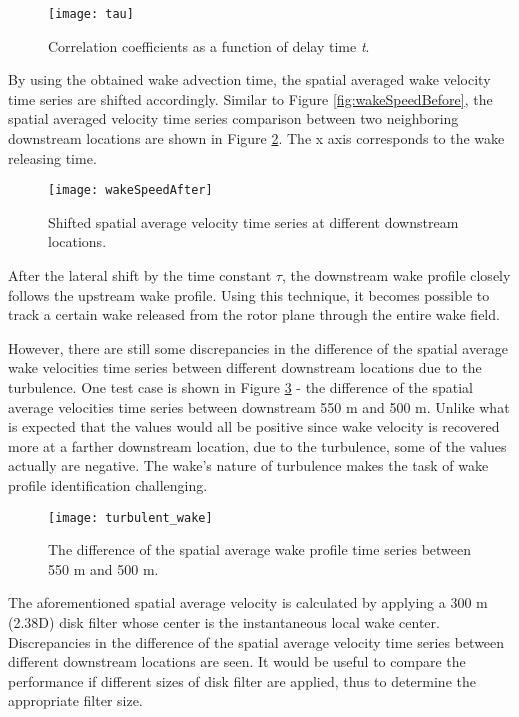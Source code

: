 \documentclass{umthesis}
\begin{document}
\begin{figure}
  \centering
  \texttt{[image: tau]}
  \caption{Correlation coefficients as a function of delay time \textit{t}.}\label{fig:tau}
\end{figure}

By using the obtained wake advection time, the spatial averaged wake velocity time series are shifted accordingly. Similar to Figure \ref{fig:wakeSpeedBefore}, the spatial averaged velocity time series comparison between two neighboring downstream locations are shown in Figure \ref{fig:wakeSpeedAfter}. The x axis corresponds to the wake releasing time.

\begin{figure}
  \centering
  \texttt{[image: wakeSpeedAfter]}
  \caption{Shifted spatial average velocity time series at different downstream locations.}\label{fig:wakeSpeedAfter}
\end{figure}

After the lateral shift by the time constant $\tau$, the downstream wake profile closely follows the upstream wake profile. Using this technique, it becomes possible to track a certain wake released from the rotor plane through the entire wake field. 

However, there are still some discrepancies in the difference of the spatial average wake velocities time series between different downstream locations due to the turbulence. One test case is shown in Figure \ref{fig:turbulent_wake} - the difference of the spatial average velocities time series between downstream 550 m and 500 m. Unlike what is expected that the values would all be positive since wake velocity is recovered more at a farther downstream location, due to the turbulence, some of the values actually are negative. The wake's nature of turbulence makes the task of wake profile identification challenging.

\begin{figure}
  \centering
  \texttt{[image: turbulent\_wake]}
  \caption{The difference of the spatial average wake profile time series between 550 m and 500 m.}\label{fig:turbulent_wake}
\end{figure}

The aforementioned spatial average velocity is calculated by applying a 300 m (2.38D) disk filter whose center is the instantaneous local wake center. Discrepancies in the difference of the spatial average velocity time series between different downstream locations are seen. It would be useful to compare the performance if different sizes of disk filter are applied, thus to determine the appropriate filter size. 
\end{document}
